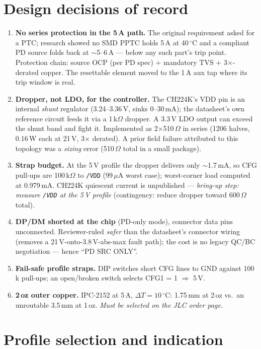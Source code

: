 \documentclass[11pt,a4paper]{article}
\newcommand{\net}[1]{\texttt{#1}}
\begin{document}
\section{Design decisions of record}\label{sec:decisions}
\begin{enumerate}\itemsep2pt
  \item \textbf{No series protection in the 5\,A path.} The original
  requirement asked for a PTC; research showed no SMD PPTC holds 5\,A at
  40\,$^\circ$C and a compliant PD source folds back at
  $\sim$5--6\,A --- below any such part's trip point. Protection chain:
  source OCP (per PD spec) + mandatory TVS + 3$\times$-derated copper. The
  resettable element moved to the 1\,A aux tap where its trip window is real.
  \item \textbf{Dropper, not LDO, for the controller.} The CH224K's VDD pin
  is an internal \emph{shunt} regulator (3.24--3.36\,V, sinks 0--30\,mA);
  the datasheet's own reference circuit feeds it via a 1\,k$\Omega$ dropper.
  A 3.3\,V LDO output can exceed the shunt band and fight it. Implemented as
  2$\times$510\,$\Omega$ in series (1206 halves, 0.16\,W each at 21\,V,
  3$\times$ derated). A prior field failure attributed to this topology was
  a \emph{sizing} error (510\,$\Omega$ total in a small package).
  \item \textbf{Strap budget.} At the 5\,V profile the dropper delivers only
  $\sim$1.7\,mA, so CFG pull-ups are 100\,k$\Omega$ to \net{/VDD}
  (99\,$\mu$A worst case); worst-corner load computed at 0.979\,mA.
  CH224K quiescent current is unpublished --- \emph{bring-up step: measure
  \net{/VDD} at the 5\,V profile} (contingency: reduce dropper toward
  600\,$\Omega$ total).
  \item \textbf{DP/DM shorted at the chip} (PD-only mode), connector data
  pins unconnected. Reviewer-ruled \emph{safer} than the datasheet's
  connector wiring (removes a 21\,V-onto-3.8\,V-abs-max fault path); the
  cost is no legacy QC/BC negotiation --- hence ``PD SRC ONLY''.
  \item \textbf{Fail-safe profile straps.} DIP switches short CFG lines to
  GND against 100\,k pull-ups; an open/broken switch selects
  CFG1 = 1 $\Rightarrow$ 5\,V.
  \item \textbf{2\,oz outer copper.} IPC-2152 at 5\,A,
  $\Delta T=10\,^\circ$C: 1.75\,mm at 2\,oz vs.\ an unroutable 3.5\,mm at
  1\,oz. \emph{Must be selected on the JLC order page.}
\end{enumerate}

\section{Profile selection and indication}
\end{document}
